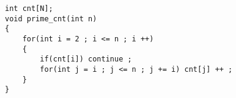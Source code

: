 \documentclass[E:/GsjzTle/main/main.tex]{subfiles}
\begin{document}
\begin{lstlisting}
int cnt[N];
void prime_cnt(int n)
{
	for(int i = 2 ; i <= n ; i ++)
	{
		if(cnt[i]) continue ;
		for(int j = i ; j <= n ; j += i) cnt[j] ++ ;
	}
}
\end{lstlisting}
\end{document}
